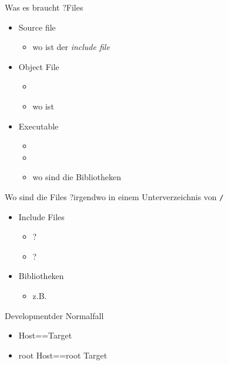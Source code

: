 \begin{frame}{Was es braucht ?}{Files}
 \begin{itemize}
  \item Source file
  \begin{itemize}
   \item wo ist der {\em include file} 
  \end{itemize}
  \item Object File
  \begin{itemize}
   \item {}
   \item wo ist 
  \end{itemize}
  \item Executable
  \begin{itemize}
  \item {}
  \item {}
  \item wo sind die Bibliotheken
  \end{itemize}
 \end{itemize}
\end{frame}

\begin{frame}{Wo sind die Files ?}{irgendwo in einem Unterverzeichnis von {\Huge\tt /}}
 \begin{itemize}
  \item Include Files 
  \begin{itemize}
   \item {} ?
   \item {} ? 
  \end{itemize}
  \item Bibliotheken
  \begin{itemize}
   \item z.B. 
  \end{itemize}
 \end{itemize}
\end{frame}

\begin{frame}{Development}{der Normalfall}
 \begin{itemize}
  \item Host==Target
  \item root Host==root Target
 \end{itemize}
\end{frame}


